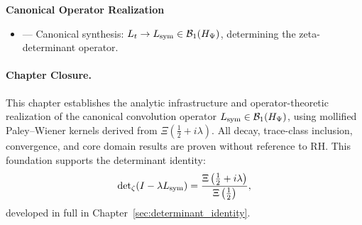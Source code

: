 \textbf{Canonical Operator Realization}
\begin{itemize}
  \item {} — Canonical synthesis: \( L_t \to L_{\mathrm{sym}} \in \mathcal{B}_1(H_{\Psi}) \), determining the zeta-determinant operator.
\end{itemize}

\paragraph{Chapter Closure.}
This chapter establishes the analytic infrastructure and operator-theoretic realization of the canonical convolution operator \( L_{\mathrm{sym}} \in \mathcal{B}_1(H_{\Psi}) \), using mollified Paley--Wiener kernels derived from \( \Xi(\tfrac{1}{2} + i\lambda) \). All decay, trace-class inclusion, convergence, and core domain results are proven without reference to RH. This foundation supports the determinant identity:
\[
\det\nolimits_{\zeta}(I - \lambda L_{\mathrm{sym}})
= \frac{\Xi\left(\tfrac{1}{2} + i\lambda \right)}{\Xi\left(\tfrac{1}{2} \right)},
\]
developed in full in Chapter~\ref{sec:determinant_identity}.
